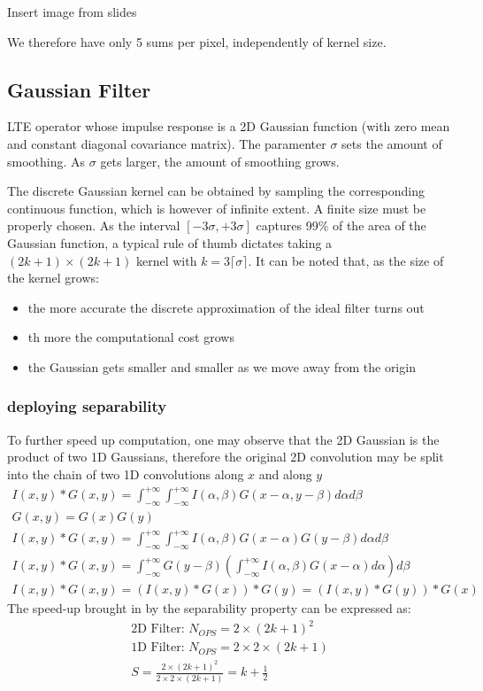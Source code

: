 \documentclass{article}
\begin{document}
Insert image from slides

We therefore have only 5 sums per pixel, independently of kernel size.

\subsection{Gaussian Filter}
LTE operator whose impulse response is a 2D Gaussian function (with zero mean and constant diagonal covariance matrix). The paramenter $\sigma$ sets the amount of smoothing. As $\sigma$ gets larger, the amount of smoothing grows.

The discrete Gaussian kernel can be obtained by sampling the corresponding continuous function, which is however of infinite extent. A finite size must be properly chosen. As the interval $[-3\sigma, +3\sigma]$ captures 99\% of the area of the Gaussian function, a typical rule of thumb dictates taking a $(2k+1)\times(2k+1)$ kernel with $k=3\lceil \sigma \rceil$.
It can be noted that, as the size of the kernel grows:
\begin{itemize}
    \item the more accurate the discrete approximation of the ideal filter turns out
    \item th more the computational cost grows
    \item the Gaussian gets smaller and smaller as we move away from the origin
\end{itemize}
\subsubsection{deploying separability}
To further speed up computation, one may observe that the 2D Gaussian is the product of two 1D Gaussians, therefore the original 2D convolution may be split into the chain of two 1D convolutions along $x$ and along $y$
\begin{gather}
    I(x,y) \ast G(x,y) = \int_{-\infty}^{+\infty}\int_{-\infty}^{+\infty}I(\alpha,\beta)G(x-\alpha,y-\beta)d\alpha d\beta\\
    G(x,y)=G(x)G(y)\\
    I(x,y)\ast G(x,y) = \int_{-\infty}^{+\infty}\int_{-\infty}^{+\infty} I(\alpha,\beta)G(x-\alpha)G(y-\beta)d\alpha d\beta\\
    I(x,y)\ast G(x,y) = \int_{-\infty}^{+\infty}G(y-\beta)\left(\int_{-\infty}^{+\infty} I(\alpha,\beta)G(x-\alpha)d\alpha \right) d\beta\\
    I(x,y)\ast G(x,y) = (I(x,y)\ast G(x))\ast G(y) = (I(x,y) \ast G(y)) \ast G(x)
\end{gather}
The speed-up brought in by the separability property can be expressed as:
\begin{gather}
    \text{2D Filter: } N_{OPS} = 2\times(2k+1)^2\\
    \text{1D Filter: } N_{OPS} = 2\times2\times(2k+1)\\
    S=\frac{2\times(2k+1)^2}{ 2\times2\times(2k+1) } = k+ \frac{1}{2}
\end{gather}
\end{document}
